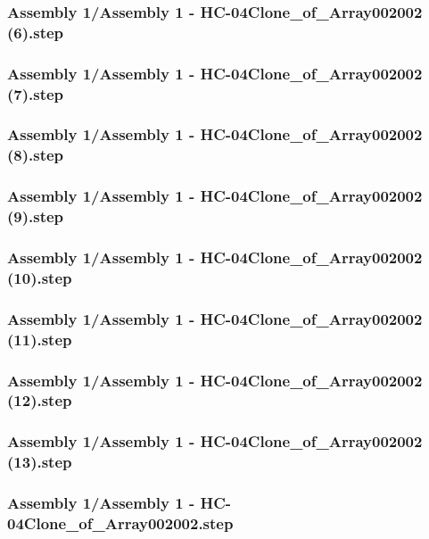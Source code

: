 \documentclass[a4paper,12pt]{article}
\begin{document}
\begin{lstlising}[language=C++]
\subsubsection{Assembly 1/Assembly 1 - HC-04Clone_of_Array002002 (6).step}

\subsubsection{Assembly 1/Assembly 1 - HC-04Clone_of_Array002002 (7).step}

\subsubsection{Assembly 1/Assembly 1 - HC-04Clone_of_Array002002 (8).step}

\subsubsection{Assembly 1/Assembly 1 - HC-04Clone_of_Array002002 (9).step}

\subsubsection{Assembly 1/Assembly 1 - HC-04Clone_of_Array002002 (10).step}

\subsubsection{Assembly 1/Assembly 1 - HC-04Clone_of_Array002002 (11).step}

\subsubsection{Assembly 1/Assembly 1 - HC-04Clone_of_Array002002 (12).step}

\subsubsection{Assembly 1/Assembly 1 - HC-04Clone_of_Array002002 (13).step}

\subsubsection{Assembly 1/Assembly 1 - HC-04Clone_of_Array002002.step}


\end{lstlising}
\end{document}
